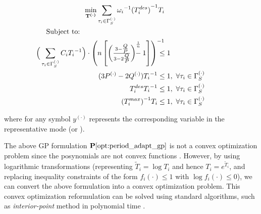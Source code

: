\begin{myoptimizationproblem} \label{opt:period_adapt_gp}
\vspace*{-2.0em}
\begin{subequations}
\begin{align*}
\underset{\mathbf{T}^{\boldsymbol{(\cdot)} }}{\operatorname{min}} \sum_{\tau_i \in \Gamma_S^{(\cdot)}} {\omega_i}^{-1}  {(T_i^{des})}^{-1}  T_i \hspace*{-1em} \\
\text{Subject to:~~~} \hspace*{10em} 
\nonumber \\
\Big( \sum_{\tau_i \in \Gamma_S^{(\cdot)}} C_i {T_i}^{-1} \Big) \cdot   \left(n \left[ \left( \tfrac{3 - \tfrac{Q}{P}}{3 - 2 \tfrac{Q}{P}} \right)^{\frac{1}{n}} \hspace*{-1em}- 1\right]\right)^{-1} \hspace*{-1em} &\leq 1\\
(3P^{(\cdot)} - 2Q^{(\cdot)}) {T_i} ^{-1} &\leq 1,  ~\forall \tau_i \in \Gamma_S^{(\cdot)} \hspace*{2em} \\
T_i^{des} {T_i}^{-1} &\leq 1,  ~\forall \tau_i \in \Gamma_S^{(\cdot)}  \hspace*{2em} \\
 {(T_i^{max})}^{-1} T_i &\leq 1,  ~ \forall \tau_i \in \Gamma_S^{(\cdot)} 
\end{align*}
\end{subequations}
\end{myoptimizationproblem}
\hspace{-1.4em} 
where for any symbol $y^{(\cdot)}$ represents the corresponding variable in the representative mode (\eg \pve or \ave). 



The above GP formulation $\mathbf{P}\mathbf{\ref{opt:period_adapt_gp}}$ is not a convex optimization problem since the posynomials are not convex functions \cite{GP_tutorial}. However, by using logarithmic transformations (\eg representing $\tilde{T}_i = \log T_i$ and hence $T_i = e^{\tilde{T}_i}$, and replacing inequality constraints of the form $f_i(\cdot) \leq 1$ with $\log f_i(\cdot) \leq 0$), we can convert the above formulation into a convex optimization problem. This convex optimization reformulation can be solved using standard algorithms, such as \textit{interior-point} method in polynomial time \cite[Ch. 11]{boyd_book}.

